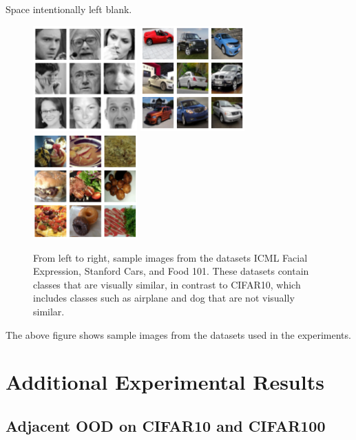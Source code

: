 \documentclass{article} %
\theoremstyle{plain}
\theoremstyle{definition}
\theoremstyle{remark}
\begin{document}
\label{fig:icmlface}

Space intentionally left blank. 

\clearpage
\begin{figure}[ht]
    \centering\includegraphics[width=4cm]{icmlface.png} \hfill
    \includegraphics[width=4cm]{cars.png} \hfill
    \includegraphics[width=4cm]{food101.png}
    \caption{From left to right, sample images from the datasets ICML Facial Expression, Stanford Cars, and Food 101. These datasets contain classes that are visually similar, in contrast to CIFAR10, which includes classes such as airplane and dog that are not visually similar.}
    \label{fig:icmlface images}
\end{figure}

The above figure shows sample images from the datasets used in the experiments.

\section{Additional Experimental Results}

\subsection{Adjacent OOD on CIFAR10 and CIFAR100}
\end{document}
